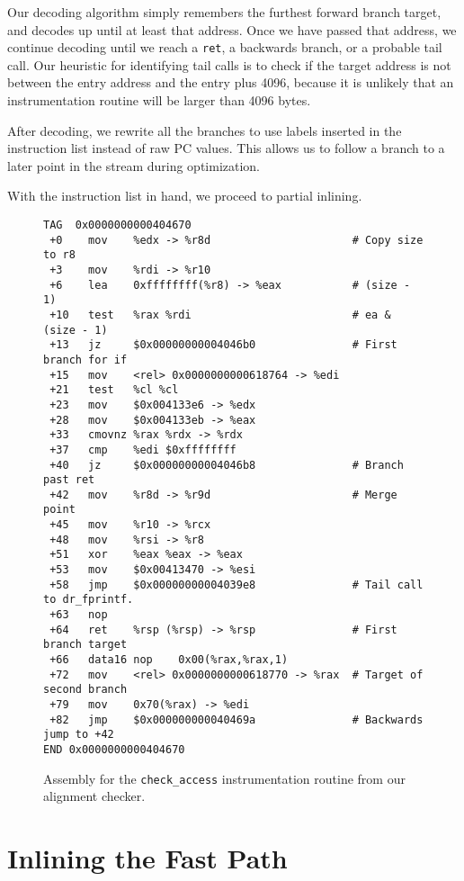 Our decoding algorithm simply remembers the furthest forward branch target, and
decodes up until at least that address.  Once we have passed that address, we
continue decoding until we reach a {\tt ret}, a backwards branch, or a probable
tail call.  Our heuristic for identifying tail calls is to check if the target
address is not between the entry address and the entry plus 4096, because it is
unlikely that an instrumentation routine will be larger than 4096 bytes.

After decoding, we rewrite all the branches to use labels inserted in the
instruction list instead of raw PC values.  This allows us to follow a branch to
a later point in the stream during optimization.

With the instruction list in hand, we proceed to partial inlining.

\begin{figure}
\begin{verbatim}
TAG  0x0000000000404670
 +0    mov    %edx -> %r8d                      # Copy size to r8
 +3    mov    %rdi -> %r10
 +6    lea    0xffffffff(%r8) -> %eax           # (size - 1)
 +10   test   %rax %rdi                         # ea & (size - 1)
 +13   jz     $0x00000000004046b0               # First branch for if
 +15   mov    <rel> 0x0000000000618764 -> %edi
 +21   test   %cl %cl
 +23   mov    $0x004133e6 -> %edx
 +28   mov    $0x004133eb -> %eax
 +33   cmovnz %rax %rdx -> %rdx
 +37   cmp    %edi $0xffffffff
 +40   jz     $0x00000000004046b8               # Branch past ret
 +42   mov    %r8d -> %r9d                      # Merge point
 +45   mov    %r10 -> %rcx
 +48   mov    %rsi -> %r8
 +51   xor    %eax %eax -> %eax
 +53   mov    $0x00413470 -> %esi
 +58   jmp    $0x00000000004039e8               # Tail call to dr_fprintf.
 +63   nop
 +64   ret    %rsp (%rsp) -> %rsp               # First branch target
 +66   data16 nop    0x00(%rax,%rax,1)
 +72   mov    <rel> 0x0000000000618770 -> %rax  # Target of second branch
 +79   mov    0x70(%rax) -> %edi
 +82   jmp    $0x000000000040469a               # Backwards jump to +42
END 0x0000000000404670
\end{verbatim}
\caption{Assembly for the {\tt check\_access} instrumentation routine from our
alignment checker.}
\label{fig:alignment_asm}
\end{figure}

\section{Inlining the Fast Path}
\label{sec:inlining_fastpath}

